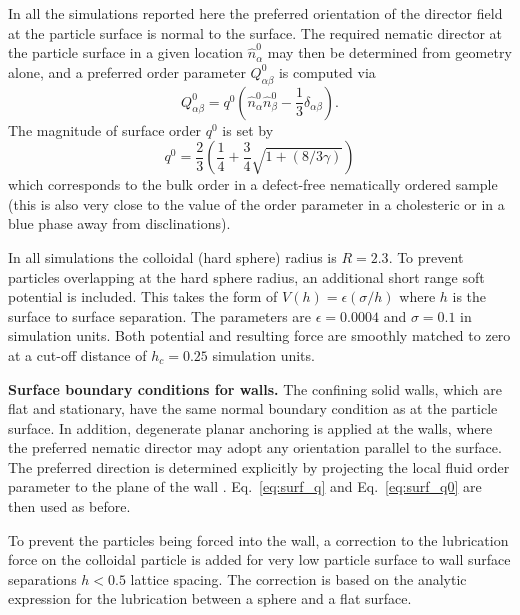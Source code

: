 \documentclass[12pt]{article}
\begin{document}
In all the simulations reported here the preferred orientation of the
director field at the particle surface is normal to the surface. The
required nematic director at the particle surface in a given location
$\hat{n}^0_\alpha$ may then be determined from geometry alone,
and a preferred order parameter $Q_{\alpha\beta}^0$ is computed via
\begin{equation}
Q^0_{\alpha\beta} = q^0(\hat{n}_\alpha^0 \hat{n}_\beta^0 
- {\textstyle \frac{1}{3}} \delta_{\alpha\beta}).
\label{eq:surf_q}
\end{equation}
The magnitude of surface order $q^0$ is set by
\begin{equation}
q^0 = {\textstyle \frac{2}{3}} \left( {\textstyle \frac{1}{4}} 
+ {\textstyle \frac{3}{4}} \sqrt{1 + (8/3\gamma)} \right)
\label{eq:surf_q0}
\end{equation}
which corresponds to the bulk order in a defect-free nematically ordered 
sample~\cite{denniston} (this is also very close to the value of the order 
parameter in a cholesteric or in a blue phase away from disclinations).

In all simulations the colloidal (hard sphere) radius is $R = 2.3$. To
prevent particles overlapping at the hard sphere radius, an additional
short range soft potential is included. This takes the form of
$V(h) = \epsilon (\sigma/h)$ where $h$ is the surface to surface separation.
The parameters are $\epsilon = 0.0004$ and $\sigma = 0.1$ in simulation
units. Both potential and resulting force are smoothly matched to zero at
a cut-off distance of $h_c = 0.25$ simulation units.

\medskip
\noindent
\textbf{Surface boundary conditions for walls.}
The confining solid walls, which are flat and stationary, have the
same normal boundary condition as at the particle surface. In addition,
degenerate planar anchoring is applied at the walls, where the
preferred nematic director may adopt any orientation parallel
to the surface. The preferred direction is determined explicitly
by projecting the local fluid order parameter to the plane of the
wall \cite{fournier2005}. Eq.~\ref{eq:surf_q} and Eq.~\ref{eq:surf_q0}
are then used as before.

To prevent the particles being forced into the wall, a correction
to the lubrication force on the colloidal particle is added for very low
particle
surface to wall surface separations $h < 0.5$ lattice spacing. The
correction is based on the analytic expression for the lubrication
between a sphere and a flat surface.
\end{document}
